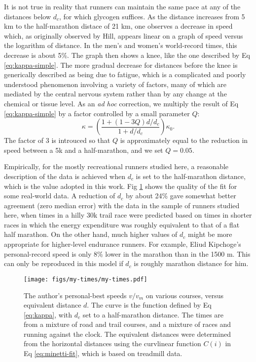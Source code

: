 \documentclass[10pt,letterpaper]{article}
\begin{document}
It is not true in reality that runners can maintain the same pace at any of the distances below
$d_c$, for which glycogen suffices. As the distance increases from 5 km to the half-marathon
distace of 21 km, one observes a decrease in speed which, as originally observed by Hill,\cite{hill} appears
linear on a graph of speed versus the logarithm of distance. In the men's and women's world-record
times, this decrease is about 5\%. The graph then shows a knee, like the one described by Eq \ref{eq:kappa-simple}.
The more gradual decrease for distances before the knee is generically described as being due to fatigue, which is
a complicated and poorly understood phenomenon involving a variety of factors, many of which are mediated
by the central nervous system rather than by any change at the chemical or tissue level. As an \emph{ad hoc}
correction, we multiply the result of Eq \ref{eq:kappa-simple} by a factor
controlled by a small parameter $Q$:
\begin{equation}\label{eq:kappa}
  \kappa = \left(\frac{1+(1-3Q)d/d_c}{1+d/d_c}\right) \kappa_0.
\end{equation}
The factor of 3 is introuced so that $Q$ is approximately equal to the reduction in speed between a 5k and a half-marathon,
and we set $Q=0.05$.

Empirically, for the mostly recreational runners studied here, a reasonable description of the data is achieved when
$d_c$ is set to the half-marathon distance, which is the value adopted in this work.
Fig \ref{fig:my-times} shows the quality of the fit for some real-world data.
A reduction of $d_c$ by about 24\% gave somewhat better agreement (zero median error) with the data in the sample of runners studied
here,  when times in a hilly 30k trail race were
predicted based on times in shorter races in which the energy expenditure was roughly equivalent to that of
a flat half marathon.
On the other hand, much higher values of $d_c$ might be more appropriate for higher-level endurance runners.
For example, Eliud Kipchoge's personal-record
speed is only 8\% lower in the marathon than in the 1500 m. This can only be reproduced in this model if $d_c$
is roughly marathon distance for him.

\begin{figure}[h]
\texttt{[image: figs/my-times/my-times.pdf]}
\centering
\caption{The author's personal-best speeds $v/v_m$ on various courses, versus equivalent distance $d$.
The curve is the function defined by Eq \ref{eq:kappa}, with $d_c$ set to a half-marathon distance.
The times are from a mixture of road and trail courses, and a mixture of races and running against the clock.
The equivalent distances were determined from the horizontal distances using the curvlinear
function $C(i)$ in Eq \ref{eq:minetti-fit}, which is based on treadmill data.}
\label{fig:my-times}
\end{figure}
\end{document}
